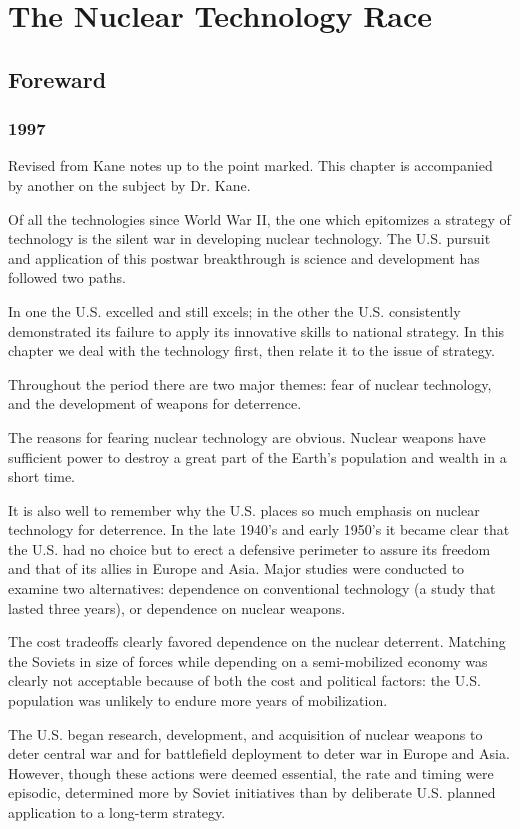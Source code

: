 \chapter{The Nuclear Technology Race}

\section{Foreward}
\subsection{1997}
Revised from Kane notes up to the point marked. This chapter is accompanied by another on the subject by Dr. Kane.

Of all the technologies since World War II, the one which epitomizes a strategy of technology is the silent war in developing nuclear technology. The U.S. pursuit and application of this postwar breakthrough is science and development has followed two paths.

In one the U.S. excelled and still excels; in the other the U.S. consistently demonstrated its failure to apply its innovative skills to national strategy. In this chapter we deal with the technology first, then relate it to the issue of strategy.

Throughout the period there are two major themes: fear of nuclear technology, and the development of weapons for deterrence.

The reasons for fearing nuclear technology are obvious. Nuclear weapons have sufficient power to destroy a great part of the Earth's population and wealth in a short time.

It is also well to remember why the U.S. places so much emphasis on nuclear technology for deterrence. In the late 1940's and early 1950's it became clear that the U.S. had no choice but to erect a defensive perimeter to assure its freedom and that of its allies in Europe and Asia. Major studies were conducted to examine two alternatives: dependence on conventional technology (a study that lasted three years), or dependence on nuclear weapons.

The cost tradeoffs clearly favored dependence on the nuclear deterrent. Matching the Soviets in size of forces while depending on a semi-mobilized economy was clearly not acceptable because of both the cost and political factors: the U.S. population was unlikely to endure more years of mobilization.

The U.S. began research, development, and acquisition of nuclear weapons to deter central war and for battlefield deployment to deter war in Europe and Asia. However, though these actions were deemed essential, the rate and timing were episodic, determined more by Soviet initiatives than by deliberate U.S. planned application to a long-term strategy.

